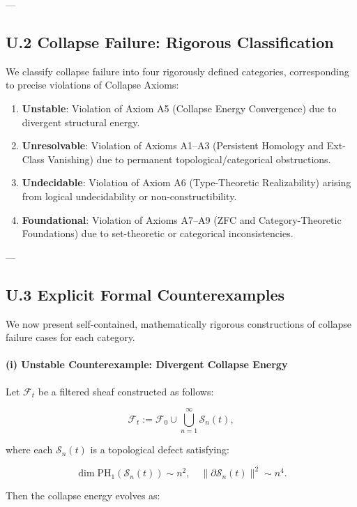 \documentclass[11pt]{article}
\begin{document}
---

\subsection*{U.2 Collapse Failure: Rigorous Classification}

We classify collapse failure into four rigorously defined categories, corresponding to precise violations of Collapse Axioms:

\begin{enumerate}
    \item \textbf{Unstable}: Violation of Axiom A5 (Collapse Energy Convergence) due to divergent structural energy.
    \item \textbf{Unresolvable}: Violation of Axioms A1–A3 (Persistent Homology and Ext-Class Vanishing) due to permanent topological/categorical obstructions.
    \item \textbf{Undecidable}: Violation of Axiom A6 (Type-Theoretic Realizability) arising from logical undecidability or non-constructibility.
    \item \textbf{Foundational}: Violation of Axioms A7–A9 (ZFC and Category-Theoretic Foundations) due to set-theoretic or categorical inconsistencies.
\end{enumerate}

---

\subsection*{U.3 Explicit Formal Counterexamples}

We now present self-contained, mathematically rigorous constructions of collapse failure cases for each category.

\paragraph{(i) Unstable Counterexample: Divergent Collapse Energy}

Let $\mathcal{F}_t$ be a filtered sheaf constructed as follows:

\[
\mathcal{F}_t := \mathcal{F}_0 \cup \bigcup_{n=1}^\infty \mathcal{S}_n(t),
\]

where each $\mathcal{S}_n(t)$ is a topological defect satisfying:

\[
\dim \mathrm{PH}_1(\mathcal{S}_n(t)) \sim n^2, \quad \|\partial \mathcal{S}_n(t)\|^2 \sim n^4.
\]

Then the collapse energy evolves as:
\end{document}
